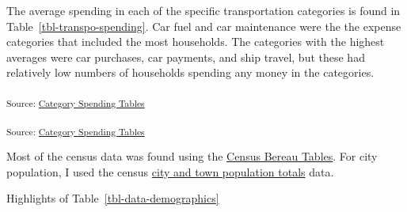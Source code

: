 \documentclass[
]{agujournal2019}
\begin{document}
The average spending in each of the specific transportation categories
is found in Table~\ref{tbl-transpo-spending}. Car fuel and car
maintenance were the the expense categories that included the most
households. The categories with the highest averages were car purchases,
car payments, and ship travel, but these had relatively low numbers of
households spending any money in the categories.

\begin{table}

\caption{\label{tbl-category-spending}Average Spending per Household in
Each Category}

\centering{

}

\end{table}%

\textsubscript{Source:
\href{https://KamrynMansfield.github.io/transpo_budget_ces/notebooks/category_spending_table-preview.html\#cell-tbl-category-spending}{Category
Spending Tables}}

\begin{table}

\caption{\label{tbl-transpo-spending}Average Transportation Spending per
Household in Each Category}

\centering{

}

\end{table}%

\textsubscript{Source:
\href{https://KamrynMansfield.github.io/transpo_budget_ces/notebooks/transpo_spending_table-preview.html\#cell-tbl-transpo-spending}{Category
Spending Tables}}

Most of the census data was found using the
\href{https://data.census.gov/table}{Census Bereau Tables}. For city
population, I used the census
\href{https://www.census.gov/data/tables/time-series/demo/popest/2020s-total-cities-and-towns.html}{city
and town population totals} data.

Highlights of Table~\ref{tbl-data-demographics}
\end{document}
